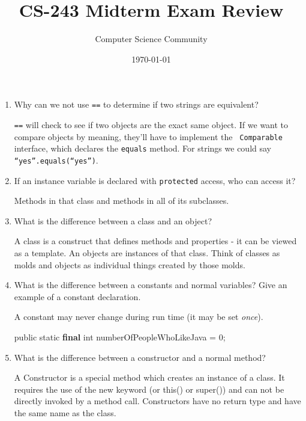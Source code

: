 \documentclass[11pt]{article}
\author{Computer Science Community}
\title{CS-243 Midterm Exam Review}
\date{\today}
\newenvironment{answer}{\large\lstset{basicstyle=\large}\color{white}}{}
\newenvironment{answer}{\large\lstset{basicstyle=\large}\color{red}}{}
\begin{document}
\header

\begin{enumerate}

\item Why can we not use {\tt ==} to determine if two strings are equivalent?

    \begin{answer}
    {\tt ==} will check to see if two objects are the exact same object. If we
    want to compare objects by meaning, they'll have to implement the {\tt
    Comparable} interface, which declares the {\tt equals} method. For strings
    we could say {\tt ``yes''.equals(``yes'')}.
    \end{answer}

\item If an instance variable is declared with {\tt protected} access, who can
      access it?

    \begin{answer}
    Methods in that class and methods in all of its subclasses.
    \end{answer}

\item What is the difference between a class and an object?

    \begin{answer}
    A class is a construct that defines methods and properties - it can be viewed as a template. An objects are instances of that class. Think of classes as molds and objects as individual things created by those molds.
    \end{answer}

\item What is the difference between a constants and normal variables? Give an
      example of a constant declaration.

    \begin{answer}
    A constant may never change during run time (it may be set {\em once}).

    public static {\bf final} int numberOfPeopleWhoLikeJava = 0;
    \end{answer}

\item What is the difference between a constructor and a normal method?

    \begin{answer}
A Constructor is a special method which creates an instance of a class. It requires the use of the new keyword (or this() or super()) and can not be directly invoked by a method call. Constructors have no return type and have the same name as the class. 
    \end{answer}


\end{enumerate}
\end{document}
